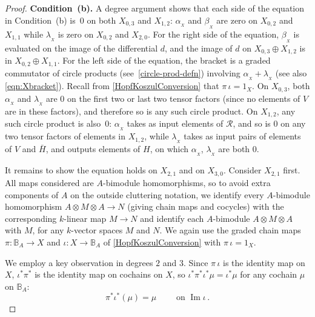 \documentclass[11pt]{amsart}
\numberwithin{equation}{section}
\DeclareMathOperator{\ima}{Im}
\newcommand{\X}{_X}
\newcommand{\alphax}{\alpha_{\X}}
\newcommand{\betax}{\beta_{\X}}
\newcommand{\lambdax}{\lambda_{\X}}
\newcommand{\A}{A}%
\newcommand{\sA}{A }
\newcommand{\R}{\mathcal{R}}
\newcommand{\BB}{\mathbb{B}} %
\renewcommand{\_}[1]{\mbox{$_{\left( #1 \right)}$}}
\newcommand{\ot}{\otimes}
\begin{document}
{\begin{proof}
\vspace{2ex}

{\bf Condition~(b).}
A degree argument shows 
that each side of the equation in Condition~(b) is~0
on both $X_{0,3}$ and $X_{1,2}$:
$\alphax$ and $\betax$ are zero on $X_{0,2}$ and $X_{1,1}$
while $\lambdax$ is zero on $X_{0,2}$ and $X_{2,0}$.
For the right side of the equation, $\betax$ is evaluated on the image
of the differential $d$, and the image of $d$ on
$X_{0,3}\oplus X_{1,2}$ is in $X_{0,2}\oplus X_{1,1}$. 
For the left side of the equation, the bracket is a graded commutator
of circle products (see~\cref{circle-prod-defn})
involving $\alphax + \lambdax$ (see also \cref{eqn:Xbracket}).
Recall from \cref{HopfKoszulConversion} that $\pi\, \iota = 1_X$.
On $X_{0,3}$, both $\alphax$ and $\lambdax$ are 0
on the first two or last two tensor factors (since no elements
of $V$ are in these factors),
and therefore so is any such circle product.
On $X_{1,2}$, any such circle product is also~0:
$\alphax$ takes as input elements of $\R$, and so is $0$ on 
any two tensor factors of elements in $X_{1,2}$,
while $\lambdax$ takes as input pairs of elements of $V$ and $\bar H$,
and outputs elements of $H$, on which $\alphax$,
$\lambdax$ are both $0$. 


It remains to show the equation holds 
on $X_{2,1}$ and on $X_{3,0}$. 
Consider $X_{2,1}$ first.
All maps considered are $A$-bimodule homomorphisms,
so to avoid extra components of $A$ on the outside cluttering notation,
we identify
every $A$-bimodule homomorphism 
$\A\ot M \ot A \rightarrow  N$
(giving chain maps and cocycles)
with the corresponding $k$-linear map $M\rightarrow N$
and identify each $A$-bimodule $A\ot M \ot A$ with $M$,
for any $k$-vector spaces $M$ and $N$.
We again use the graded chain maps $\pi: \BB_A\rightarrow X$ and 
$\iota: X\rightarrow \BB_A$ of 
\cref{HopfKoszulConversion}
with $\pi \, \iota =1_X$.

We employ a key observation in degrees $2$ and $3$.
Since $\pi\, \iota$ is the identity map on $X$,
$\iota^*\pi^*$ is the identity map on cochains on $X$,
so $\iota^*\pi^*\iota^*\mu=\iota^*\mu$ for any cochain $\mu$
on $\BB_A$:
\begin{equation}\label{KeyObservation}
 \pi^*\iota^*(\mu)
= \mu
\qquad\text{ on $\ima\iota$}
\, .
\end{equation}



\end{proof}}
\end{document}
